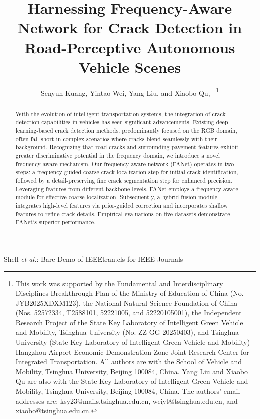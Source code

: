 \documentclass[journal]{IEEEtran}
\begin{document}
\title{Harnessing Frequency-Aware Network for Crack Detection in Road-Perceptive Autonomous Vehicle Scenes}


\author{Senyun Kuang, Yintao Wei, Yang Liu, and Xiaobo Qu,~%
\thanks{This work was supported by the Fundamental and Interdisciplinary Disciplines Breakthrough Plan of the Ministry of Education of China (No. JYB2025XDXM123), the National Natural Science Foundation of China (Nos. 52572334, T2588101, 52221005, and 52220105001), the Independent Research Project of the State Key Laboratory of Intelligent Green Vehicle and Mobility, Tsinghua University (No. ZZ-GG-20250403), and Tsinghua University (State Key Laboratory of Intelligent Green Vehicle and Mobility) -- Hangzhou Airport Economic Demonstration Zone Joint Research Center for Integrated Transportation. All authors are with the School of Vehicle and Mobility, Tsinghua University, Beijing 100084, China. Yang Liu and Xiaobo Qu are also with the State Key Laboratory of Intelligent Green Vehicle and Mobility, Tsinghua University, Beijing 100084, China. The authors' email addresses are: ksy23@mails.tsinghua.edu.cn, weiyt@tsinghua.edu.cn, and xiaobo@tsinghua.edu.cn.}}

%
{Shell \MakeLowercase{\textit{et al.}}: Bare Demo of IEEEtran.cls for IEEE Journals}

\maketitle


\begin{abstract}
With the evolution of intelligent transportation systems, the integration of crack detection capabilities in vehicles has seen significant advancements. Existing deep-learning-based crack detection methods, predominantly focused on the RGB domain, often fall short in complex scenarios where cracks blend seamlessly with their background. Recognizing that road cracks and surrounding pavement features exhibit greater discriminative potential in the frequency domain, we introduce a novel frequency-aware mechanism. Our frequency-aware network (FANet) operates in two steps: a frequency-guided coarse crack localization step for initial crack identification, followed by a detail-preserving fine crack segmentation step for enhanced precision. Leveraging features from different backbone levels, FANet employs a frequency-aware module for effective coarse localization. Subsequently, a hybrid fusion module integrates high-level features via prior-guided correction and incorporates shallow features to refine crack details. Empirical evaluations on five datasets demonstrate FANet's superior performance.
\end{abstract}
\end{document}
